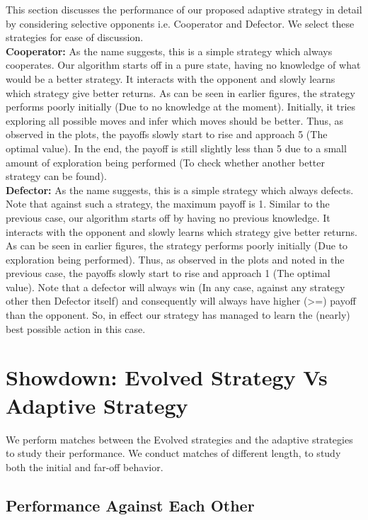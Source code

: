 \documentclass[a4paper]{article}
\begin{document}
	This section discusses the performance of our proposed adaptive strategy in detail by considering selective opponents i.e. Cooperator and Defector. We select these strategies for ease of discussion.\\
	
	\noindent
	\textbf{Cooperator: } As the name suggests, this is a simple strategy which always cooperates. Our algorithm starts off in a pure state, having no knowledge of what would be a better strategy. It interacts with the opponent and slowly learns which strategy give better returns. As can be seen in earlier figures, the strategy performs poorly initially (Due to no knowledge at the moment). Initially, it tries exploring all possible moves and infer which moves should be better. Thus, as observed in the plots, the payoffs slowly start to rise and approach 5 (The optimal value). In the end, the payoff is still slightly less than 5 due to a small amount of exploration being performed (To check whether another better strategy can be found).\\
	
	\noindent
	\textbf{Defector: } As the name suggests, this is a simple strategy which always defects. Note that against such a strategy, the maximum payoff is 1. 	Similar to the previous case, our algorithm starts off by having no previous knowledge. It interacts with the opponent and slowly learns which strategy give better returns. As can be seen in earlier figures, the strategy performs poorly initially (Due to exploration being performed). Thus, as observed in the plots and noted in the previous case, the payoffs slowly start to rise and approach 1 (The optimal value). Note that a defector will always win (In any case, against any strategy other then Defector itself) and consequently will always have higher (>=) payoff than the opponent. So, in effect our strategy has managed to learn the (nearly) best possible action in this case.

	\section{Showdown: Evolved Strategy Vs Adaptive Strategy}

	We perform matches between the Evolved strategies and the adaptive strategies to study their performance. We conduct matches of different length, to study both the initial and far-off behavior.
	
	\subsection{Performance Against Each Other}
\end{document}
